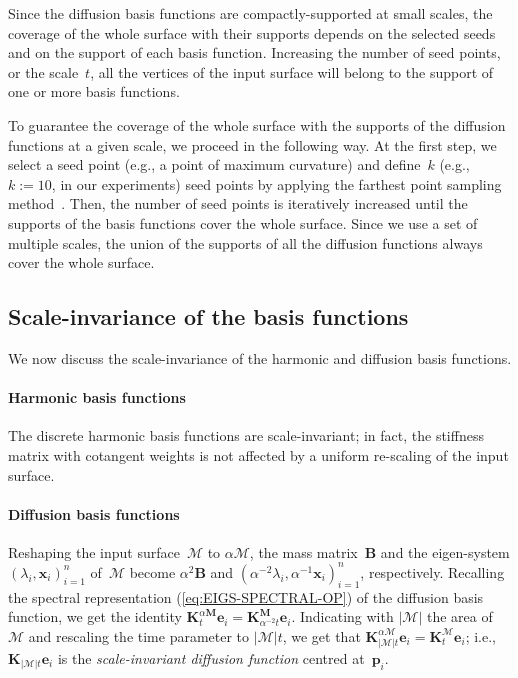 \documentclass[acmtog,authorversion]{acmart}
\begin{document}
Since the diffusion basis functions are compactly-supported at small scales, the coverage of the whole surface with their supports depends on the selected seeds and on the support of each basis function. Increasing the number of seed points, or the scale~$t$, all the vertices of the input surface will belong to the support of one or more basis functions.

To guarantee the coverage of the whole surface with the supports of the diffusion functions at a given scale, we proceed in the following way. At the first step, we select a seed point (e.g., a point of maximum curvature) and define~$k$ (e.g., \mbox{$k:=10$}, in our experiments) seed points by applying the farthest point sampling method~\citep{ELDAR2007,MOENNING2003}. Then, the number of seed points is iteratively increased until the supports of the basis functions cover the whole surface. Since we use a set of multiple scales, the union of the supports of all the diffusion functions always cover the whole surface.

\subsection{Scale-invariance of the basis functions\label{sec:ISOMETRY-INVARIANCE}}
We now discuss the scale-invariance of the harmonic and diffusion basis functions.

\paragraph*{Harmonic basis functions}
The discrete harmonic basis functions are scale-invariant; in fact, the stiffness matrix with cotangent weights is not affected by a uniform re-scaling of the input surface.

\paragraph*{Diffusion basis functions}
Reshaping the input surface~$\mathcal{M}$ to \mbox{$\alpha\mathcal{M}$}, the mass matrix~$\mathbf{B}$ and the eigen-system \mbox{$(\lambda_{i},\mathbf{x}_{i})_{i=1}^{n}$} of~$\mathcal{M}$ become \mbox{$\alpha^{2}\mathbf{B}$} and \mbox{$(\alpha^{-2}\lambda_{i},\alpha^{-1}\mathbf{x}_{i})_{i=1}^{n}$}, respectively. Recalling the spectral representation (\ref{eq:EIGS-SPECTRAL-OP}) of the diffusion basis function, we get the identity \mbox{$\mathbf{K}_{t}^{\alpha\mathbf{M}}\mathbf{e}_{i}=\mathbf{K}_{\alpha^{-2}t}^{\mathbf{M}}\mathbf{e}_{i}$}. Indicating with \mbox{$\vert\mathcal{M}\vert$} the area of~$\mathcal{M}$ and rescaling the time parameter to \mbox{$\vert\mathcal{M}\vert t$}, we get that \mbox{$\mathbf{K}_{\vert\mathcal{M}\vert t}^{\alpha\mathcal{M}}\mathbf{e}_{i}=\mathbf{K}_{t}^{\mathcal{M}}\mathbf{e}_{i}$}; i.e., \mbox{$\mathbf{K}_{\vert\mathcal{M}\vert t}\mathbf{e}_{i}$} is the \emph{scale-invariant diffusion function} centred at~$\mathbf{p}_{i}$.
\end{document}
